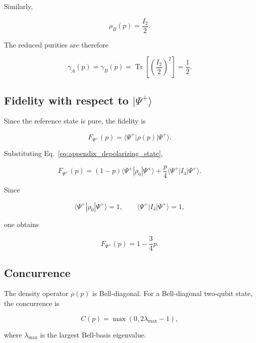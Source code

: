 Similarly,

\[
\rho_B(p)
=
\frac{I_2}{2}.
\]

The reduced purities are therefore

\begin{equation}
\gamma_A(p)
=
\gamma_B(p)
=
\operatorname{Tr}
\left[
\left(
\frac{I_2}{2}
\right)^2
\right]
=
\frac{1}{2}.
\label{eq:appendix_depolarizing_reduced_purity}
\end{equation}


\subsection*{Fidelity with respect to \texorpdfstring{\( |\Psi^+\rangle \)}{|Psi+>}}

Since the reference state is pure, the fidelity is

\[
F_{\Psi^+}(p)
=
\langle \Psi^+ |
\rho(p)
| \Psi^+ \rangle.
\]

Substituting Eq.~\eqref{eq:appendix_depolarizing_state},

\[
F_{\Psi^+}(p)
=
(1-p)
\langle \Psi^+ |
\rho_0
| \Psi^+ \rangle
+
\frac{p}{4}
\langle \Psi^+ |
I_4
| \Psi^+ \rangle.
\]

Since

\[
\langle \Psi^+ |
\rho_0
| \Psi^+ \rangle
=
1,
\qquad
\langle \Psi^+ |
I_4
| \Psi^+ \rangle
=
1,
\]

one obtains

\begin{equation}
F_{\Psi^+}(p)
=
1
-
\frac{3}{4}p.
\label{eq:appendix_depolarizing_fidelity}
\end{equation}


\subsection*{Concurrence}

The density operator \( \rho(p) \) is Bell-diagonal. For a Bell-diagonal two-qubit state, the concurrence is

\[
C(p)
=
\max
\left(
0,
2\lambda_{\max}-1
\right),
\]

where \( \lambda_{\max} \) is the largest Bell-basis eigenvalue.

